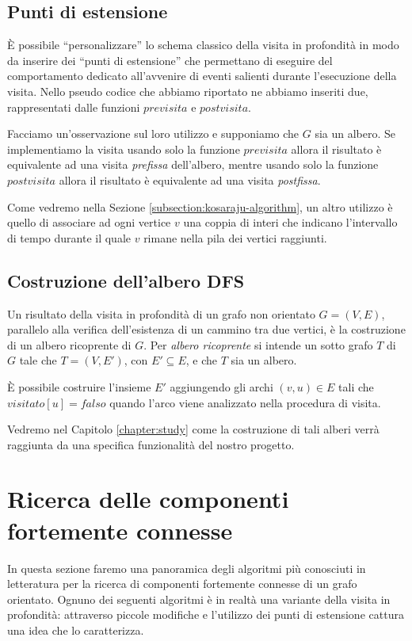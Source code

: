 \subsection{Punti di estensione}
\label{subsection:dfs-extension-point}
\`E possibile ``personalizzare'' lo schema classico della visita in
profondit\`a in modo da inserire dei ``punti di estensione'' che
permettano di eseguire del comportamento dedicato all'avvenire di
eventi salienti durante l'esecuzione della visita. Nello pseudo codice
che abbiamo riportato ne abbiamo inseriti due, rappresentati dalle
funzioni $previsita$ e $postvisita$.

Facciamo un'osservazione sul loro utilizzo e supponiamo che $G$ sia un
albero. Se implementiamo la visita usando solo la funzione $previsita$
allora il risultato \`e equivalente ad una visita \emph{prefissa}
dell'albero, mentre usando solo la funzione $postvisita$ allora
il risultato \`e equivalente ad una visita \emph{postfissa}.

Come vedremo nella Sezione \ref{subsection:kosaraju-algorithm}, un
altro utilizzo \`e quello di associare ad ogni vertice $v$ una coppia
di interi che indicano l'intervallo di tempo durante il quale $v$
rimane nella pila dei vertici raggiunti.

\subsection{Costruzione dell'albero DFS}
Un risultato della visita in profondit\`a di un grafo non orientato $G
= (V, E)$, parallelo alla verifica dell'esistenza di un cammino tra
due vertici, \`e la costruzione di un albero ricoprente di $G$. Per
\emph{albero ricoprente} si intende un sotto grafo $T$ di $G$ tale che
$T = (V, E')$, con $E' \subseteq E$, e che $T$ sia un albero.

\`E possibile costruire l'insieme $E'$ aggiungendo gli archi $(v, u)
\in E$ tali che $visitato[u] = falso$ quando l'arco viene analizzato
nella procedura di visita.

Vedremo nel Capitolo \ref{chapter:study} come la costruzione di tali
alberi verr\`a raggiunta da una specifica funzionalit\`a del nostro
progetto.

\section{Ricerca delle componenti fortemente connesse}

In questa sezione faremo una panoramica degli algoritmi pi\`u
conosciuti in letteratura per la ricerca di componenti fortemente
connesse di un grafo orientato. Ognuno dei seguenti algoritmi \`e in
realt\`a una variante della visita in profondit\`a: attraverso piccole
modifiche e l'utilizzo dei punti di estensione cattura una idea che lo
caratterizza.

